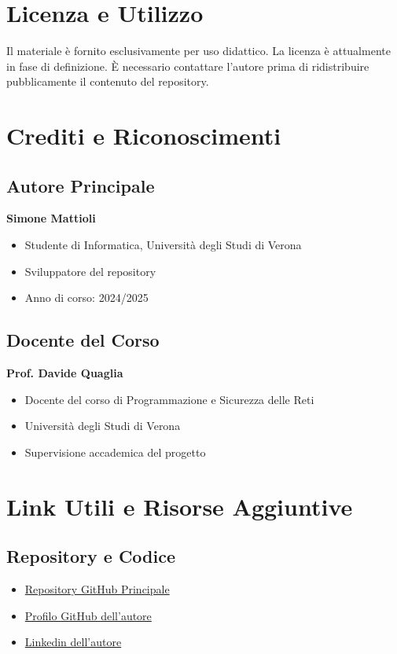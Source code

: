 \documentclass[12pt,a4paper]{article}
\begin{document}
\section{Licenza e Utilizzo}

\begin{tcolorbox}[colback=red!10!white,colframe=red!75!black,title=Importante - Licenza]
Il materiale è fornito esclusivamente per uso didattico. La licenza è attualmente in fase di definizione. È necessario contattare l'autore prima di ridistribuire pubblicamente il contenuto del repository.
\end{tcolorbox}

\section{Crediti e Riconoscimenti}

\subsection{Autore Principale}
\textbf{Simone Mattioli}
\begin{itemize}
    \item Studente di Informatica, Università degli Studi di Verona
    \item Sviluppatore del repository
    \item Anno di corso: 2024/2025
\end{itemize}

\subsection{Docente del Corso}
\textbf{Prof. Davide Quaglia}
\begin{itemize}
    \item Docente del corso di Programmazione e Sicurezza delle Reti
    \item Università degli Studi di Verona
    \item Supervisione accademica del progetto
\end{itemize}

\section{Link Utili e Risorse Aggiuntive}

\subsection{Repository e Codice}
\begin{itemize}
    \item \href{https://github.com/simo-hue/Corso-Programmazione-Sicurezza-delle-Reti}{Repository GitHub Principale}
    \item \href{https://github.com/simo-hue}{Profilo GitHub dell'autore}
    \item \href{https://www.linkedin.com/in/simonemattioli2003/}{Linkedin dell'autore}
\end{itemize}
\end{document}
